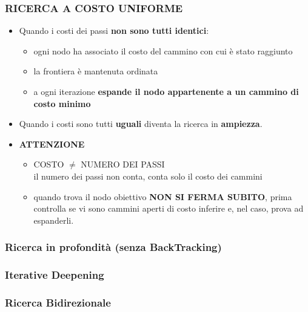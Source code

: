 \documentclass[14pt]{extarticle}
\begin{document}
\subsubsection{RICERCA A COSTO UNIFORME}
\begin{itemize}
    \item Quando i costi dei passi \textbf{non sono tutti identici}:
        \begin{itemize}
            \item ogni nodo ha associato il costo del cammino con cui è stato raggiunto
            \item la frontiera è mantenuta ordinata
            \item a ogni iterazione \textbf{espande il nodo appartenente a un cammino di costo minimo}
        \end{itemize}
    \item Quando i costi sono tutti \textbf{uguali} diventa la ricerca in \textbf{ampiezza}.
    \item \textbf{ATTENZIONE}
    \begin{itemize}
        \item COSTO $\neq$ NUMERO DEI PASSI\\il numero dei passi non conta, conta solo il costo dei cammini
        \item quando trova il nodo obiettivo \textbf{NON SI FERMA SUBITO}, prima controlla se vi sono cammini aperti di costo inferire e, nel caso, prova ad espanderli.
    \end{itemize}
\end{itemize}
\subsubsection{Ricerca in profondità (senza BackTracking)}
\subsubsection{Iterative Deepening}
\subsubsection{Ricerca Bidirezionale}
\end{document}
